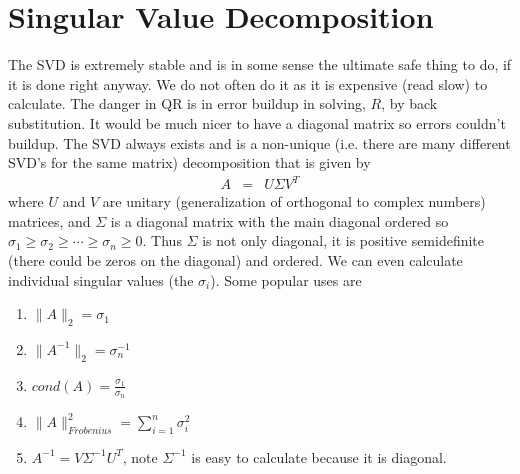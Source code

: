 \section{Singular Value Decomposition}

The SVD is extremely stable and is in some sense the ultimate safe thing to do, if it is done right anyway.  We do not often do it as it is expensive (read slow) to calculate.  The danger in QR is in error buildup in solving, $R$, by back substitution.  It would be much nicer to have a diagonal matrix so errors couldn't buildup.  The SVD always exists and is a non-unique (i.e. there are many different SVD's for the same matrix) decomposition that is given by
\begin{eqnarray}
A &=& U\Sigma V^T
\end{eqnarray}
where $U$ and $V$ are unitary (generalization of orthogonal to complex numbers) matrices, and $\Sigma$ is  a diagonal matrix with the main diagonal ordered so $\sigma_1\geq\sigma_2\geq\cdots\geq\sigma_n\geq 0$.  Thus $\Sigma$ is not only diagonal, it is positive semidefinite (there could be zeros on the diagonal) and ordered.  We can even calculate individual singular values (the $\sigma_i$).  Some popular uses are
\begin{enumerate}
\item $\|A\|_2=\sigma_1$
\item $\|A^{-1}\|_2=\sigma_n^{-1}$
\item $cond(A)=\frac{\sigma_1}{\sigma_n}$
\item $\|A\|_{Frobenius}^2=\sum_{i=1}^n\sigma_i^2$
\item $A^{-1} = V\Sigma^{-1}U^T$, note $\Sigma^{-1}$ is easy to calculate because it is diagonal.
\end{enumerate} 